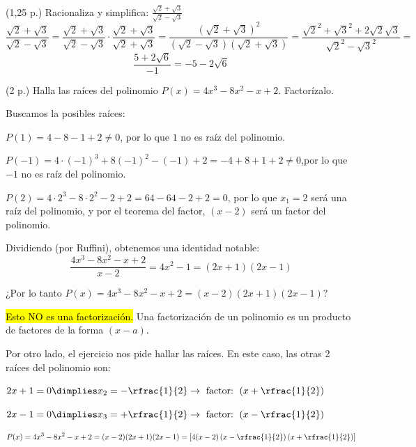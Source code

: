 \documentclass[palatino,nosec]{Docencia}
\begin{document}
\begin{problem} (1,25 p.)
Racionaliza y simplifica: $\displaystyle \frac{\sqrt{2}+\sqrt{3}}{\sqrt{2}-\sqrt{3}}$
\solution
\[
	\frac{\sqrt{2}+\sqrt{3}}{\sqrt{2}-\sqrt{3}} = \frac{\sqrt{2}+\sqrt{3}}{\sqrt{2}-\sqrt{3}} · \frac{\sqrt{2}+\sqrt{3}}{\sqrt{2}+\sqrt{3}} = \frac{(\sqrt{2}+\sqrt{3})^2}{(\sqrt{2}-\sqrt{3})(\sqrt{2}+\sqrt{3})} = \frac{\sqrt{2}^2+\sqrt{3}^2+2\sqrt{2}\sqrt{3}}{\sqrt{2}^2-\sqrt{3}^2} =
\]
\[
	 \frac{5+2\sqrt{6}}{-1} = -5-2\sqrt{6}
\]

\end{problem}


\begin{problem} (2 p.) 
Halla las raíces del polinomio $P(x) = 4x^3-8x^2-x+2$. Factorízalo.

\solution

Buscamos la posibles raíces:

$P(1) = 4-8-1+2 ≠ 0$, por lo que $1$ no es raíz del polinomio.

$P(-1) = 4·(-1)^3 + 8(-1)^2-(-1)+2 = -4+8+1+2 ≠ 0$,por lo que $-1$ no es raíz del polinomio.

$P(2) = 4·2^3-8·2^2-2+2 = 64-64-2+2 = 0$, por lo que $x_1=2$ será una raíz del polinomio, y por el teorema del factor, $(x-2)$ será un factor del polinomio.



Dividiendo (por Ruffini), obtenemos una identidad notable: 
\[
	\frac{4x^3-8x^2-x+2}{x-2} = 4x^2-1 = (2x+1)(2x-1)
\]


¿Por lo tanto $P(x) = 4x^3-8x^2-x+2 = (x-2)(2x+1)(2x-1)$?

\hl{Esto NO es una factorización.} Una factorización de un polinomio es un producto de factores de la forma $(x-a)$. 

Por otro lado, el ejercicio nos pide hallar las raíces. En este caso, las otras 2 raíces del polinomio son:

$2x+1 = 0 \dimplies x_2=-\rfrac{1}{2} \to\text{ factor: } \left(x+\rfrac{1}{2}\right)$

$2x-1 = 0 \dimplies x_3=+\rfrac{1}{2} \to\text{ factor: } \left(x-\rfrac{1}{2}\right)$

\[
P(x) = 4x^3-8x^2-x+2 = (x-2)(2x+1)(2x-1) = \left[4(x-2)\left(x-\rfrac{1}{2}\right)\left(x+\rfrac{1}{2}\right)\right]
\]



\end{problem}
\end{document}

